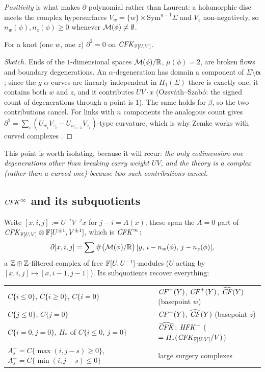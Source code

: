 \emph{Positivity} is what makes $\partial$ polynomial rather than Laurent: a holomorphic disc meets the
complex hypersurfaces $V_w=\{w\}\times\mathrm{Sym}^{g-1}\Sigma$ and $V_z$ non-negatively, so
$n_w(\phi),n_z(\phi)\ge0$ whenever $\mathcal{M}(\phi)\ne\emptyset$.

\begin{proposition}[$\partial^2=0$]\label{prop:d2}
For a knot (one $w$, one $z$) $\partial^2=0$ on $\mathit{CFK}_{\mathbb{F}[U,V]}$.
\end{proposition}
\begin{proof}[Sketch]
Ends of the $1$-dimensional spaces $\mathcal{M}(\phi)/\mathbb{R}$, $\mu(\phi)=2$, are broken flows and boundary
degenerations.  An $\alpha$-degeneration has domain a component of $\Sigma\setminus\boldsymbol\alpha$; since the
$g$ $\alpha$-curves are linearly independent in $H_1(\Sigma)$ there is exactly one, it contains both
$w$ and $z$, and it contributes $UV\cdot x$ (Ozsv\'ath--Szab\'o: the signed count of degenerations
through a point is $1$).  The same holds for $\beta$, so the two contributions cancel.  For links with
$n$ components the analogous count gives
$\partial^2=\sum_i(U_{w_i}V_{z_i}-U_{w_{i+1}}V_{z_i})$-type curvature, which is why Zemke works with
curved complexes \cite{Zemke-link}.
\end{proof}
This point is worth isolating, because it will recur: \emph{the only codimension-one degenerations
other than breaking carry weight $UV$, and the theory is a complex (rather than a curved one)
because two such contributions cancel.}

\subsection{$\mathit{CFK}^\infty$ and its subquotients}
Write $[x,i,j]:=U^{-i}V^{-j}x$ for $j-i=A(x)$; these span the $A=0$ part of
$\mathit{CFK}_{\mathbb{F}[U,V]}\otimes\mathbb{F}[U^{\pm1},V^{\pm1}]$, which is $\mathit{CFK}^\infty$:
\[
\partial[x,i,j]=\sum \#\big(\mathcal{M}(\phi)/\mathbb{R}\big)\,[y,\,i-n_w(\phi),\,j-n_z(\phi)],
\]
a $\mathbb{Z}\oplus\mathbb{Z}$-filtered complex of free $\mathbb{F}[U,U^{-1}]$-modules ($U$ acting by $[x,i,j]\mapsto[x,i-1,j-1]$).
Its subquotients recover everything:
\begin{center}\small
\begin{tabular}{ll}
\toprule
$C\{i\le0\}$, $C\{i\ge0\}$, $C\{i=0\}$ & $\mathit{CF}^-(Y)$, $\mathit{CF}^+(Y)$, $\widehat{\mathit{CF}}(Y)$ (basepoint $w$)\\
$C\{j\le0\}$, $C\{j=0\}$ & $\mathit{CF}^-(Y)$, $\widehat{\mathit{CF}}(Y)$ (basepoint $z$)\\
$C\{i=0,j=0\}$, $H_*$ of $C\{i\le 0,\ j=0\}$ & $\widehat{\mathit{CFK}}$; $\mathit{HFK}^-$ ($=H_*(\mathit{CFK}_{\mathbb{F}[U,V]}/V)$)\\
$A^+_s=C\{\max(i,j-s)\ge0\}$, $A^-_s=C\{\min(i,j-s)\le0\}$ & large surgery complexes\\
\bottomrule
\end{tabular}
\end{center}

